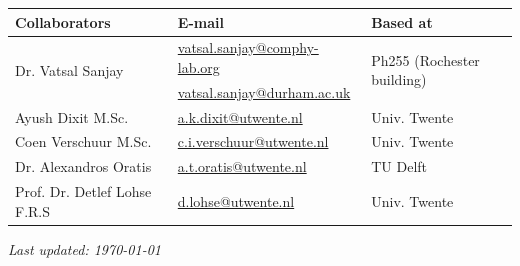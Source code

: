 \documentclass[11pt]{article}
\begin{document}
\begin{center}
\begin{tabular}{|l|l|l|}
\hline \textbf{Collaborators} & \textbf{E-mail} & \textbf{Based at} \\
\hline \multirow{2}{*}{Dr. Vatsal Sanjay} & \href{mailto:vatsal.sanjay@comphy-lab.org}{vatsal.sanjay@comphy-lab.org} & \multirow{2}{*}{Ph255 (Rochester building)} \\
& \href{mailto:vatsal.sanjay@durham.ac.uk}{vatsal.sanjay@durham.ac.uk} & \\
\hline Ayush Dixit M.Sc. & \href{mailto:a.k.dixit@utwente.nl}{a.k.dixit@utwente.nl} & Univ. Twente \\
\hline Coen Verschuur M.Sc. & \href{mailto:c.i.verschuur@utwente.nl}{c.i.verschuur@utwente.nl} & Univ. Twente \\
\hline Dr. Alexandros Oratis   & \href{mailto:a.t.oratis@utwente.nl}{a.t.oratis@utwente.nl}& TU Delft \\
\hline Prof. Dr. Detlef Lohse F.R.S & \href{mailto:d.lohse@utwente.nl}{d.lohse@utwente.nl} & Univ. Twente  \\
\hline
\end{tabular}
\end{center}

\vspace{1em}
\noindent\textit{Last updated: \today}

\printbibliography
\end{document}
